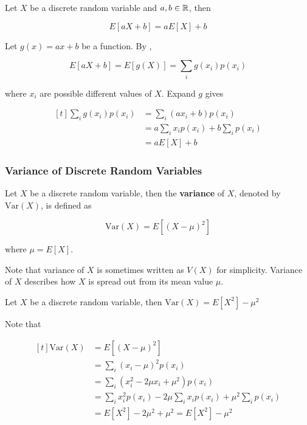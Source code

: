 \documentclass[a4paper,12pt]{article}
\begin{document}
\begin{crl}
  Let $X$ be a discrete random variable and $a,b\in\mathbb{R}$, then
  
  $$E[aX+b]=aE[X]+b$$\s

  \prf Let $g(x)=ax+b$ be a function. By \rpst[\sctr{0}],

  $$E[aX+b]=E[g(X)]=\sum_{i}g(x_{i})p(x_{i})$$\s

  where $x_{i}$ are possible different values of $X$. Expand $g$ gives

  $$\begin{aligned}[t]
    \sum_{i}g(x_{i})p(x_{i})&=\sum_{i}(ax_{i}+b)p(x_{i})\\
    &=a\sum_{i}x_{i}p(x_{i})+b\sum_{i}p(x_{i})\\
    &=aE[X]+b
  \end{aligned}$$
\end{crl}

\subsubsection{Variance of Discrete Random Variables}
\begin{dft}
  Let $X$ be a discrete random variable, then the \textbf{variance} of $X$, denoted by $\mathrm{Var}(X)$, is defined as

  $$\mathrm{Var}(X)=E[(X-\mu)^{2}]$$\s

  where $\mu=E[X]$.
\end{dft}\n

Note that variance of $X$ is sometimes written as $V(X)$ for simplicity. Variance of $X$ describes how $X$ is spread out from its mean value $\mu$.\n

\begin{pst}
  Let $X$ be a discrete random variable, then $\mathrm{Var}(X)=E[X^{2}]-\mu^{2}$\n

  \prf Note that
  
  $$\begin{aligned}[t]
    \mathrm{Var}(X)&=E[(X-\mu)^{2}]\\
    &=\sum_{i}(x_{i}-\mu)^{2}p(x_{i})\\
    &=\sum_{i}(x_{i}^{2}-2\mu x_{i}+\mu^{2})p(x_{i})\\
    &=\sum_{i}x_{i}^{2}p(x_{i})-2\mu\sum_{i}x_{i}p(x_{i})+\mu^{2}\sum_{i}p(x_{i})\\
    &=E[X^{2}]-2\mu^{2}+\mu^{2}=E[X^{2}]-\mu^{2}
  \end{aligned}$$
\end{pst}\n
\end{document}
